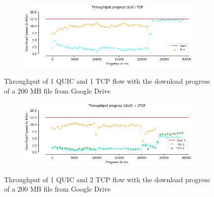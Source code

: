 \begin{frame}

\begin{figure}[!htb]
    \centering
    \begin{subfigure}{0.5\textwidth}
        \includegraphics[width=\linewidth]{./plots/PI/throughput/ThroughtputprogressQUIC+TCP.png}
    \end{subfigure}
    
    \caption{Throughput of 1 QUIC and 1 TCP flow with the download progress of a 200 MB file from Google Drive}\label{fig:throughput-of-2go}
\end{figure}

\begin{figure}[!htb]
    \centering
    \begin{subfigure}{0.5\textwidth}
        \includegraphics[width=\linewidth]{./plots/PI/throughput/Throughtputprogress1QUIC+2TCP.png}
    \end{subfigure}
    
    \caption{Throughput of 1 QUIC and 2 TCP flow with the download progress of a 200 MB file from Google Drive}\label{fig:throughput-of-c}
\end{figure}

\end{frame}
\clearpage

